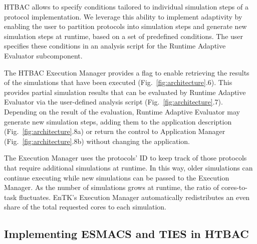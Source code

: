 HTBAC allows to specify conditions tailored to individual simulation steps of
a protocol implementation. We leverage this ability to implement adaptivity
by enabling the user to partition protocols into simulation steps and
generate new simulation steps at runtime, based on a set of predefined
conditions. The user specifies these conditions in an analysis script for the
Runtime Adaptive Evaluator subcomponent.

The HTBAC Execution Manager provides a flag to enable retrieving the results
of the simulations that have been executed (Fig.~\ref{fig:architecture}.6).
This provides partial simulation results that can be evaluated by Runtime
Adaptive Evaluator via the user-defined analysis script
(Fig.~\ref{fig:architecture}.7). Depending on the result of the evaluation,
Runtime Adaptive Evaluator may generate new simulation steps, adding them to
the application description (Fig.~\ref{fig:architecture}.8a) or return the
control to Application Manager (Fig.~\ref{fig:architecture}.8b) without
changing the application.

The Execution Manager uses the protocols' ID to keep track of those protocols
that require additional simulations at runtime. In this way, older
simulations can continue executing while new simulations can be passed to the
Execution Manager. As the number of simulations grows at runtime, the ratio
of cores-to-task fluctuates. EnTK's Execution Manager automatically
redistributes an even share of the total requested cores to each simulation.

\subsection{Implementing ESMACS and TIES in
HTBAC}\label{sec:implementation_htbac}





